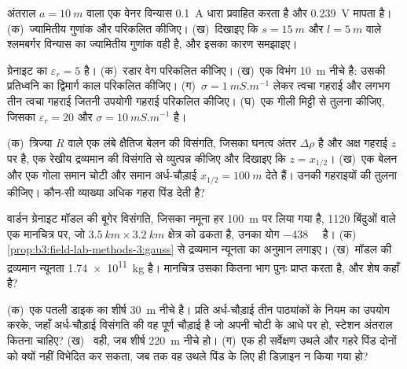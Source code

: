 \begin{exercise}[$\star$]\label{exo:b3:field-lab-methods-3:3}
अंतराल $a = \qty{10}{m}$ वाला एक वेनर विन्यास \qty{0.1}{A} धारा प्रवाहित करता है और
\qty{0.239}{V} मापता है। (क)~ज्यामितीय गुणांक और
 परिकलित कीजिए। (ख)~दिखाइए कि $s =
\qty{15}{m}$ और $l = \qty{5}{m}$ वाले श्लमबर्गर विन्यास का ज्यामितीय गुणांक वही है, और
इसका कारण समझाइए।
\end{exercise}

\begin{exercise}[$\star$]\label{exo:b3:field-lab-methods-3:4}
ग्रेनाइट का $\varepsilon_r = 5$ है। (क)~रडार वेग परिकलित कीजिए। (ख)~एक
विभंग \qty{10}{m} नीचे है: उसकी प्रतिध्वनि का द्विमार्ग काल परिकलित कीजिए।
(ग)~$\sigma = \qty{1}{mS.m^{-1}}$ लेकर त्वचा गहराई और
लगभग तीन त्वचा गहराई जितनी उपयोगी गहराई परिकलित कीजिए। (घ)~एक गीली मिट्टी से तुलना कीजिए, जिसका
$\varepsilon_r = 20$ और $\sigma = \qty{10}{mS.m^{-1}}$ है।
\end{exercise}

\begin{exercise}[$\star\star$]\label{exo:b3:field-lab-methods-3:5}
(क)~त्रिज्या $R$ वाले एक लंबे क्षैतिज बेलन की विसंगति,
जिसका घनत्व अंतर $\Delta\rho$ है और अक्ष गहराई $z$ पर है, एक रेखीय द्रव्यमान की विसंगति से
व्युत्पन्न कीजिए और दिखाइए कि $z = x_{1/2}$। (ख)~एक बेलन और एक गोला
समान चोटी और समान अर्ध-चौड़ाई $x_{1/2} = \qty{100}{m}$ देते हैं।
उनकी गहराइयों की तुलना कीजिए। कौन-सी व्याख्या अधिक गहरा पिंड देती है?
\end{exercise}

\begin{exercise}[$\star\star$]\label{exo:b3:field-lab-methods-3:6}
वार्डन ग्रेनाइट मॉडल की बूगेर विसंगति, जिसका नमूना हर
\qty{100}{m} पर लिया गया है, \num{1120} बिंदुओं वाले एक मानचित्र पर, जो $\qty{3.5}{km}
\times \qty{3.2}{km}$ क्षेत्र को ढकता है, उनका योग \qty{-438}{\milli\gal} है। (क)~
\cref{prop:b3:field-lab-methods-3:gauss} से द्रव्यमान न्यूनता का अनुमान लगाइए।
(ख)~मॉडल की द्रव्यमान न्यूनता \qty{1.74e11}{kg} है। मानचित्र उसका कितना भाग
पुनः प्राप्त करता है, और शेष कहाँ है?
\end{exercise}

\begin{exercise}[$\star\star$]\label{exo:b3:field-lab-methods-3:7}
(क)~एक पतली डाइक का शीर्ष \qty{30}{m} नीचे है। प्रति अर्ध-चौड़ाई तीन पाठ्यांकों के नियम का उपयोग करके,
जहाँ अर्ध-चौड़ाई विसंगति की वह पूर्ण चौड़ाई है जो अपनी चोटी के आधे पर हो,
स्टेशन अंतराल कितना चाहिए? (ख)~
वही, जब शीर्ष \qty{220}{m} नीचे हो। (ग)~एक ही सर्वेक्षण उथले और गहरे पिंड दोनों को क्यों नहीं
विभेदित कर सकता, जब तक वह
उथले पिंड के लिए ही डिज़ाइन न किया गया हो?
\end{exercise}

